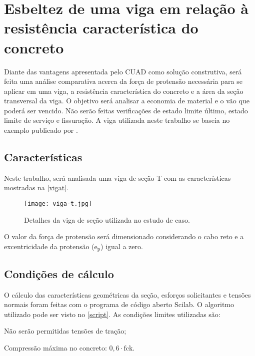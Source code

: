 \chapter{Esbeltez de uma viga em relação à resistência característica do concreto}

Diante das vantagens apresentada pelo CUAD como solução construtiva, será feita uma análise comparativa acerca da força de protensão necessária para se aplicar em uma viga, a resistência característica do concreto e a área da seção transversal da viga. O objetivo será analisar a economia de material e o vão que poderá ser vencido. Não serão feitas verificações de estado limite último, estado limite de serviço e fissuração. A viga utilizada neste trabalho se baseia no exemplo publicado por .


\section{Características}

Neste trabalho, será analisada uma viga de seção T com as características mostradas na \autoref{vigat}.

\begin{figure}[htb]
	\caption{\label{vigat} Detalhes da viga de seção  utilizada no estudo de caso.}
		\begin{center}
			\texttt{[image: viga-t.jpg]}
		\end{center}
\end{figure}


O valor da força de protensão será dimensionado considerando o cabo reto e a excentricidade da protensão ($ \text{e}_{\text{p}} $) igual a zero.

\section{Condições de cálculo}

O cálculo das características geométricas da seção, esforços solicitantes e tensões normais foram feitas com o programa de código aberto Scilab. O algoritmo utilizado pode ser visto no \autoref{script}. As condições limites utilizadas são:

\begin{alineas}
	\item Não serão permitidas tensões de tração;
	\item Compressão máxima no concreto: $ 0,6 \cdot \text{fck} $.
\end{alineas}

